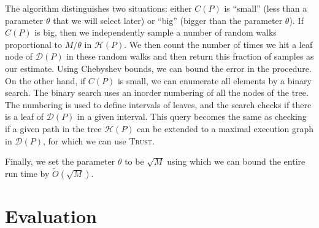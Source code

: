 \documentclass[acmsmall]{acmart}
\def\RM#1{{\textcolor{red}{\textbf{RM:} #1}}}
\def\MZ#1{{\textcolor{blue}{\textbf{MZ:} #1}}}
\renewcommand{\RM}[1]{}
\renewcommand{\MZ}[1]{}
\newcommand{\trust}{\textsc{Trust}\xspace}
\newcommand{\timeout}{$\VarClock$}
\newcommand{\oom}{\textsf{OOM}}
\begin{document}
The algorithm distinguishes two situations: either $C(P)$ is ``small'' (less than a parameter $\theta$ that we will select later)
or ``big'' (bigger than the parameter $\theta$).
If $C(P)$ is big, then we independently sample a number of random walks proportional to $M/\theta$ in $\mathcal{H}(P)$.
We then count the number of times we hit a leaf node of $\mathcal{D}(P)$ in these random walks and then return this fraction of samples as our estimate.
Using Chebyshev bounds, we can bound the error in the procedure.
On the other hand, if $C(P)$ is small, we can enumerate all elements by a binary search.
The binary search uses an inorder numbering of all the nodes of the tree.
The numbering is used to define intervals of leaves, and the search checks if there is a leaf of $\mathcal{D}(P)$ in a given interval.
This query becomes the same as checking if a given path in the tree $\mathcal{H}(P)$ can be extended to a maximal execution graph in $\mathcal{D}(P)$, for which we can use \trust.

Finally, we set the parameter $\theta$ to be $\sqrt{M}$ using which we can bound the entire run time by $\tilde{O}(\sqrt{M})$. 






\section{Evaluation}\label{sec:experiment}

\end{document}
